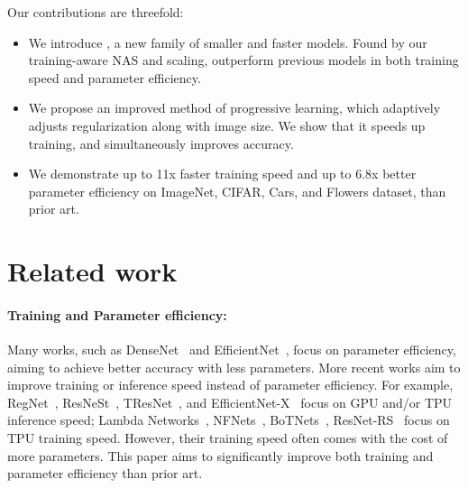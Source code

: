 \documentclass{article}
\begin{document}
Our contributions are threefold: 
\begin{itemize}
\item We introduce {\xnet}, a new family of smaller and faster models. Found by our training-aware NAS and scaling,  {\xnet} outperform previous models in both training speed and parameter efficiency.

    \item We propose an improved method of progressive learning, which adaptively adjusts regularization along with image size. We show that it speeds up training, and simultaneously improves accuracy.

    \item We demonstrate up to 11x faster training speed and up to 6.8x better parameter efficiency on ImageNet, CIFAR, Cars, and Flowers dataset, than prior art.
\end{itemize}
\section{Related work}

\paragraph{Training and Parameter efficiency:} Many works, such as DenseNet~\cite{densenet17} and EfficientNet~\cite{efficientnet19}, focus on parameter efficiency, aiming to achieve better accuracy with less parameters. More recent works aim to improve training or inference speed instead of parameter efficiency. For example, RegNet~\cite{regnet20}, ResNeSt~\cite{resnest20}, TResNet~\cite{tresnet20}, and EfficientNet-X~\cite{efficientnetx21} focus on GPU and/or TPU inference speed; Lambda Networks~\cite{lambdanet21}, NFNets~\cite{nfnet21}, BoTNets~\cite{botnet21}, ResNet-RS~\cite{resnetrs21} focus on TPU training speed. However, their training speed often comes with the cost of more parameters. This paper aims to significantly improve both training and parameter efficiency than prior art. 
\end{document}
